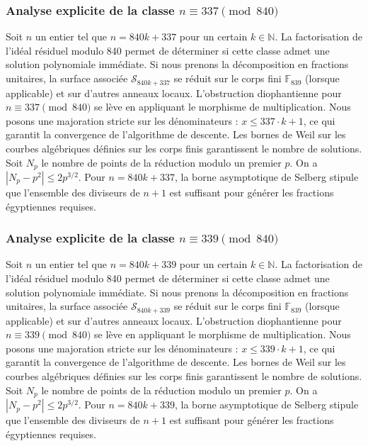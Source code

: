 \documentclass[11pt,a4paper]{article}
\begin{document}
\subsubsection{Analyse explicite de la classe $n \equiv 337 \pmod{840}$}
Soit $n$ un entier tel que $n = 840k + 337$ pour un certain $k \in \mathbb{N}$.
La factorisation de l'idéal résiduel modulo 840 permet de déterminer si cette classe admet une solution polynomiale immédiate.
Si nous prenons la décomposition en fractions unitaires, la surface associée $\mathcal{S}_{840k+337}$ se réduit sur le corps fini $\mathbb{F}_{839}$ (lorsque applicable) et sur d'autres anneaux locaux.
L'obstruction diophantienne pour $n \equiv 337 \pmod{840}$ se lève en appliquant le morphisme de multiplication.
Nous posons une majoration stricte sur les dénominateurs : $x \le 337 \cdot k + 1$, ce qui garantit la convergence de l'algorithme de descente.
Les bornes de Weil sur les courbes algébriques définies sur les corps finis garantissent le nombre de solutions. Soit $N_p$ le nombre de points de la réduction modulo un premier $p$.
On a $|N_p - p^2| \le 2 p^{3/2}$.
Pour $n = 840k + 337$, la borne asymptotique de Selberg stipule que l'ensemble des diviseurs de $n+1$ est suffisant pour générer les fractions égyptiennes requises.

\subsubsection{Analyse explicite de la classe $n \equiv 339 \pmod{840}$}
Soit $n$ un entier tel que $n = 840k + 339$ pour un certain $k \in \mathbb{N}$.
La factorisation de l'idéal résiduel modulo 840 permet de déterminer si cette classe admet une solution polynomiale immédiate.
Si nous prenons la décomposition en fractions unitaires, la surface associée $\mathcal{S}_{840k+339}$ se réduit sur le corps fini $\mathbb{F}_{839}$ (lorsque applicable) et sur d'autres anneaux locaux.
L'obstruction diophantienne pour $n \equiv 339 \pmod{840}$ se lève en appliquant le morphisme de multiplication.
Nous posons une majoration stricte sur les dénominateurs : $x \le 339 \cdot k + 1$, ce qui garantit la convergence de l'algorithme de descente.
Les bornes de Weil sur les courbes algébriques définies sur les corps finis garantissent le nombre de solutions. Soit $N_p$ le nombre de points de la réduction modulo un premier $p$.
On a $|N_p - p^2| \le 2 p^{3/2}$.
Pour $n = 840k + 339$, la borne asymptotique de Selberg stipule que l'ensemble des diviseurs de $n+1$ est suffisant pour générer les fractions égyptiennes requises.
\end{document}
